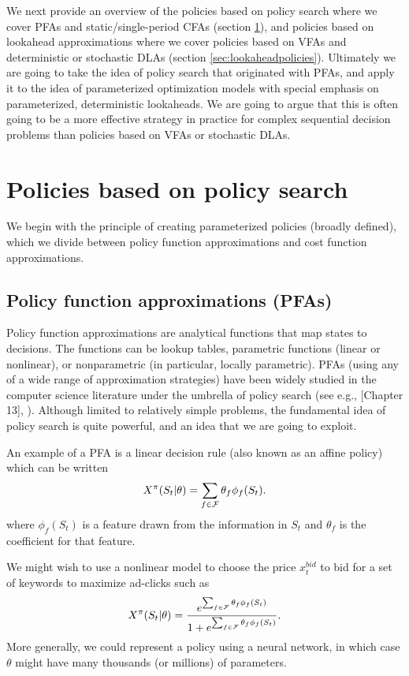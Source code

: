 \documentclass[11pt,oneside,fleqn,reqno,titlepage]{article}
\newcommand{\bn}{\begin{eqnarray}}
\newcommand{\en}{\end{eqnarray}}
\newcommand{\bns}{\begin{eqnarray*}}
\newcommand{\ens}{\end{eqnarray*}}
\newcounter{example}
\def \Fcal{{\cal F}}
\begin{document}
We next provide an overview of the policies based on policy search where we cover PFAs and static/single-period CFAs (section \ref{sec:policysearchpolicies}), and policies based on lookahead approximations where we cover policies based on VFAs and deterministic or stochastic DLAs (section \ref{sec:lookaheadpolicies}).  Ultimately we are going to take the idea of policy search that originated with PFAs, and apply it to the idea of parameterized optimization models with special emphasis on parameterized, deterministic lookaheads.  We are going to argue that this is often going to be a more effective strategy in practice for complex sequential decision problems than policies based on VFAs or stochastic DLAs.


\section{Policies based on policy search}
\label{sec:policysearchpolicies}
We begin with the principle of creating parameterized policies (broadly defined), which we divide between policy function approximations and cost function approximations.


\subsection{Policy function approximations (PFAs)}
\label{sec:pfas}
Policy function approximations are analytical functions that map states to decisions.  The functions can be lookup tables, parametric functions (linear or nonlinear), or nonparametric (in particular, locally parametric).  PFAs (using any of a wide range of approximation strategies) have been widely studied in the computer science literature under the umbrella of policy search (see e.g., \cite{Sutton2018}[Chapter 13], \cite{hadjiyiannis2011efficient,lillicrap2015continuous,levine2014learning}).  Although limited to relatively simple problems, the fundamental idea of policy search is quite powerful, and an idea that we are going to exploit.

An example of a PFA is a linear decision rule (also known as an affine policy) which can be written
\bn
X^\pi(S_t|\theta) = \sum_{f\in\Fcal} \theta_f \phi_f(S_t). \label{eq:linearpfa}
\en
where $\phi_f(S_t)$ is a feature drawn from the information in $S_t$ and $\theta_f$ is the coefficient for that feature.

We might wish to use a nonlinear model to choose the price $x^{bid}_t$ to bid for a set of keywords to maximize ad-clicks such as
\bns
X^\pi(S_t|\theta) = \frac{e^{\sum_{f\in\Fcal}\theta_f \phi_f(S_t)}}{1+e^{\sum_{f\in\Fcal}\theta_f \phi_f(S_t)}}.
\ens
More generally, we could represent a policy using a neural network, in which case $\theta$ might have many thousands (or millions) of parameters.
\end{document}
